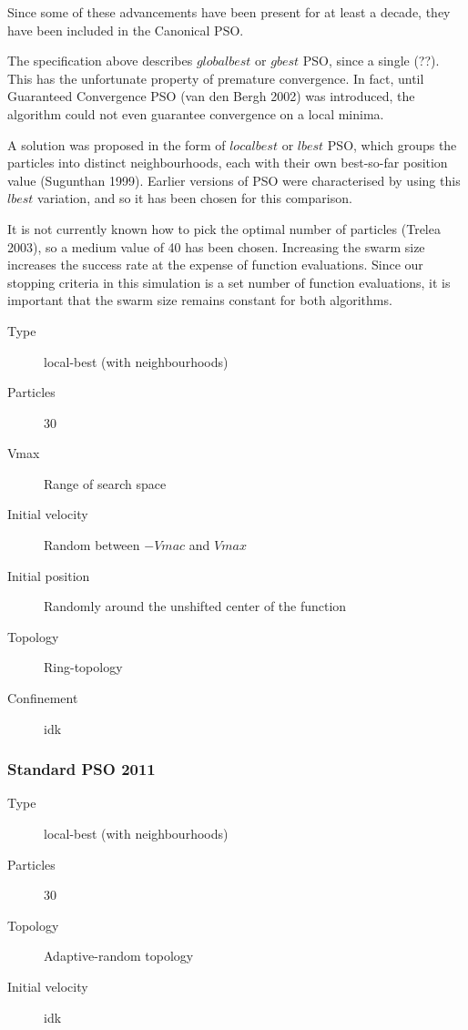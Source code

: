 \documentclass{csfourzero}
\begin{document}
Since some of these advancements have been present for at least a decade, they
have been included in the Canonical PSO.

The specification above describes $global best$ or $gbest$  PSO, since a single
(??). This has the unfortunate property of premature convergence. In fact, until
Guaranteed Convergence PSO (van den Bergh 2002) was introduced, the algorithm
could not even guarantee convergence on a local minima.

A solution was proposed in the form of $local best$ or $lbest$ PSO, which groups
the particles into distinct neighbourhoods, each with their own best-so-far
position value (Sugunthan 1999). Earlier versions of PSO were characterised by
using this $lbest$ variation, and so it has been chosen for this comparison.





It is not currently known how to pick the optimal number of particles (Trelea
2003), so a medium value of 40 has been chosen. Increasing the swarm size
increases the success rate at the expense of function evaluations. Since our
stopping criteria in this simulation is a set number of function evaluations,
it is important that the swarm size remains constant for both algorithms.



\begin{description}
  \item[Type] local-best (with neighbourhoods)
  \item[Particles] 30
  \item[Vmax] Range of search space
  \item[Initial velocity] Random between $-Vmac$ and $Vmax$
  \item[Initial position] Randomly around the unshifted center of the function
  \item[Topology] Ring-topology
  \item[Confinement] idk
\end{description}


\subsubsection{Standard PSO 2011}

\begin{description}
  \item[Type] local-best (with neighbourhoods)
  \item[Particles] 30
  \item[Topology] Adaptive-random topology
  \item[Initial velocity] idk
\end{description}
\end{document}
